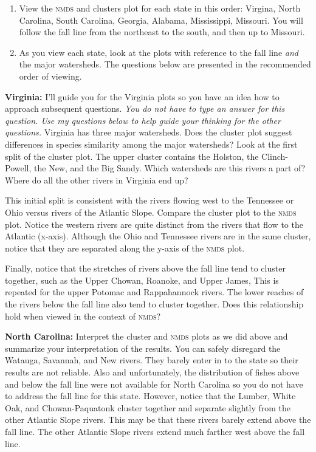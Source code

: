 \documentclass[11pt, addpoints]{exam}
\begin{document}
\begin{questions}
{\begin{enumerate}[resume]
\item  View the \textsc{nmds} and clusters plot for each state in this 
order: Virgina, North Carolina, South Carolina, Georgia, Alabama, 
Mississippi, Missouri. You will follow the fall line from the northeast 
to the south, and then up to Missouri. 

\item As you view each state, look at the plots with reference to the
fall line \emph{and} the major watersheds. The questions below are
presented in the recommended order of viewing.
\end{enumerate}
}

\question

\textbf{Virginia:} I'll guide you for the Virginia plots so you have
an idea how to approach subsequent questions. \emph{You do not have to 
type an answer for this question. Use my questions below to help guide 
your thinking for the other questions.} Virginia has three major 
watersheds. Does the cluster plot suggest differences in species 
similarity among the major watersheds?  Look at the first split of the 
cluster plot. The upper cluster contains the Holston, the Clinch-Powell, 
the New, and the Big Sandy. Which watersheds are this rivers a part of? 
Where do all the other rivers in Virginia end up? 

This initial split is consistent with the rivers flowing west to the
Tennessee or Ohio versus rivers of the Atlantic Slope. Compare the 
cluster plot to the \textsc{nmds} plot. Notice the western rivers are 
quite distinct from the rivers that flow to the Atlantic (x-axis). 
Although the Ohio and Tennessee rivers are in the same cluster, notice 
that they are  separated along the y-axis of the \textsc{nmds} plot.

Finally, notice that the stretches of rivers above the fall line 
tend to cluster together, such as the Upper Chowan, Roanoke, and Upper 
James, This is repeated for the upper Potomac and Rappahannock
rivers. The lower reaches of the rivers below the fall line 
also tend to cluster together. Does this relationship hold when viewed
in the context of \textsc{nmds?}

\question
\textbf{North Carolina:} Interpret the cluster and \textsc{nmds} plots
as we did above and summarize your interpretation of the results. You can
safely disregard the Watauga, Savannah, and New rivers. They barely enter
in to the state so their results are not reliable. Also and 
unfortunately, the distribution of fishes above and below the fall line
were not available for North Carolina so you do not have to address
the fall line for this state. However, notice that the Lumber,
White Oak, and Chowan-Paquatonk cluster together and separate slightly
from the other Atlantic Slope rivers. This may be that these rivers 
barely extend above the fall line. The other Atlantic Slope rivers 
extend much farther west above the fall line.


\end{questions}
\end{document}
